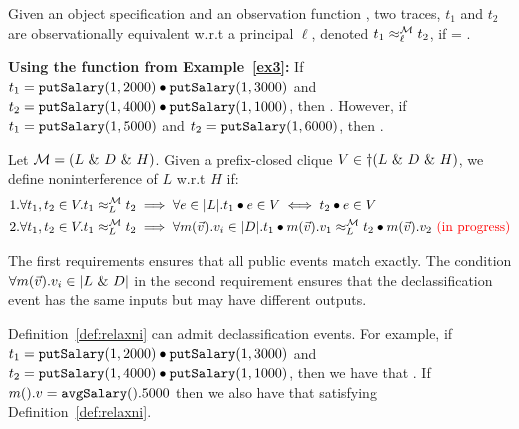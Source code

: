 \documentclass[acmsmall,screen,review, nonacm]{acmart}
\begin{document}
\begin{definition}\label{def:obsim}
Given an object specification \classpart and an observation function \obsymbol,  two traces, $t_1$ and $t_2$ are observationally equivalent w.r.t a principal $\ell$, denoted $t_1 \obsim{\ell}{\classpart} t_2$, if  =  .
\end{definition}


\textbf{Using the \obsymbol function from Example~\ref{ex3}: }
If $t_1 = \mycode{putSalary}(1, 2000) \tracecat \mycode{putSalary}(1, 3000)$ and  $t_2 = \mycode{putSalary}(1, 4000) \tracecat \mycode{putSalary}(1, 1000)$, then .
However, if $t_1 = \mycode{putSalary}(1, 5000)$ and  $t_2 = \mycode{putSalary}(1, 6000)$, then   .

\begin{definition}\label{def:relaxni}
   Let $\classpart = (L \directprod D \directprod H)$. Given a prefix-closed clique $V \in \dagger(L \directprod D \directprod H)$, we define noninterference of $L$ w.r.t $H$ if:
  \begin{align*}
   & 1. \forall t_1, t_2 \in V. \treq{t_1}{t_2}{L}{\classpart}  \implies \forall e \in \abs{L}. t_1  \tracecat e \in V \iff t_2 \tracecat e \in V  \\
   & 2. \forall t_1, t_2 \in V. \treq{t_1}{t_2}{L}{\classpart}  \implies \forall m(\vec{v}).v_i \in \abs{D}. \treq{t_1  \tracecat  m(\vec{v}).v_1}{t_2 \tracecat  m(\vec{v}).v_2}{L}{\classpart} \text{  \textcolor{red}{(in progress)}}
  \end{align*}
\end{definition}

The first requirements ensures that all public events match exactly.
The condition $\forall m(\vec{v}).v_i \in \abs{L \directprod D}$ in the second requirement ensures that the declassification event has the same inputs but may have different outputs.


Definition~\ref{def:relaxni} can admit declassification events. For example, if $t_1 = \mycode{putSalary}(1, 2000) \tracecat \mycode{putSalary}(1, 3000)$ and  $t_2 = \mycode{putSalary}(1, 4000) \tracecat \mycode{putSalary}(1, 1000)$, then we have that .
If $m().v=\mycode{avgSalary}().5000$ then we also have that  satisfying Definition~\ref{def:relaxni}.
\end{document}
